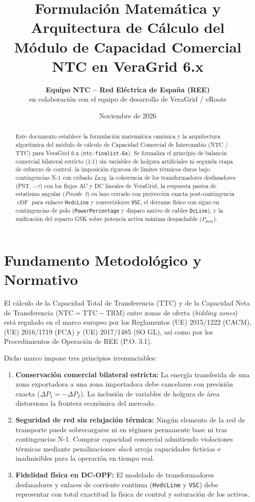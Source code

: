 \documentclass[11pt,a4paper]{article}
\title{\textbf{Formulación Matemática y Arquitectura de Cálculo del Módulo de Capacidad Comercial NTC en VeraGrid 6.x}}
\author{\textbf{Equipo NTC -- Red Eléctrica de España (REE)} \\ en colaboración con el equipo de desarrollo de VeraGrid / eRoots}
\date{Noviembre de 2026}
\begin{document}
\maketitle

\begin{abstract}
Este documento establece la formulación matemática canónica y la arquitectura algorítmica del módulo de cálculo de Capacidad Comercial de Intercambio (NTC / TTC) para VeraGrid 6.x (\texttt{ntc-finalist-6x}). Se formaliza el principio de balancín comercial bilateral estricto (1:1) sin variables de holgura artificiales ni segunda etapa de esfuerzo de control, la imposición rigurosa de límites térmicos duros bajo contingencias N-1 con cribado \textit{Lazy}, la coherencia de los transformadores desfasadores (PST, $-\tau$) con los flujos AC y DC lineales de VeraGrid, la respuesta pasiva de estatismo angular (\textit{Pmode 3}) en lazo cerrado con proyección exacta post-contingencia $\operatorname{cDF}$ para enlaces \texttt{HvdcLine} y convertidores \texttt{VSC}, el derrame físico con signo en contingencias de polo (\texttt{PowerPercentage} y disparo nativo de cables \texttt{DcLine}), y la unificación del reparto GSK sobre potencia activa máxima despachable ($P_{\max}$).
\end{abstract}

\section{Fundamento Metodológico y Normativo}
El cálculo de la Capacidad Total de Transferencia (TTC) y de la Capacidad Neta de Transferencia ($\text{NTC} = \text{TTC} - \text{TRM}$) entre zonas de oferta (\textit{bidding zones}) está regulado en el marco europeo por los Reglamentos (UE) 2015/1222 (CACM), (UE) 2016/1719 (FCA) y (UE) 2017/1485 (SO GL), así como por los Procedimientos de Operación de REE (P.O. 3.1).

Dicho marco impone tres principios irrenunciables:
\begin{enumerate}
    \item \textbf{Conservación comercial bilateral estricta:} La energía transferida de una zona exportadora a una zona importadora debe cancelarse con precisión exacta ($\Delta P_1 = -\Delta P_2$). La inclusión de variables de holgura de área distorsiona la frontera económica del mercado.
    \item \textbf{Seguridad de red sin relajación térmica:} Ningún elemento de la red de transporte puede sobrecargarse ni en régimen permanente base ni tras contingencias N-1. Comprar capacidad comercial admitiendo violaciones térmicas mediante penalizaciones \textit{slack} arroja capacidades ficticias e inadmisibles para la operación en tiempo real.
    \item \textbf{Fidelidad física en DC-OPF:} El modelado de transformadores desfasadores y enlaces de corriente continua (\texttt{HvdcLine} y \texttt{VSC}) debe representar con total exactitud la física de control y saturación de los activos.
\end{enumerate}
\end{document}
